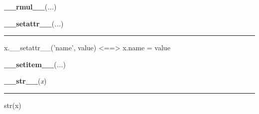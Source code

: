     \begin{boxedminipage}{\textwidth}

    \raggedright \textbf{\_\_rmul\_\_}(\textit{...})

    \end{boxedminipage}

    \label{object:__setattr__}

    \vspace{0.5ex}

    \begin{boxedminipage}{\textwidth}

    \raggedright \textbf{\_\_setattr\_\_}(\textit{...})

    \vspace{-1.5ex}

    \rule{\textwidth}{0.5\fboxrule}

x.{\_}{\_}setattr{\_}{\_}('name', value) {\textless}=={\textgreater} x.name = value
    \vspace{1ex}

    \end{boxedminipage}

    \label{bitarray:_bitarray:__setitem__}

    \vspace{0.5ex}

    \begin{boxedminipage}{\textwidth}

    \raggedright \textbf{\_\_setitem\_\_}(\textit{...})

    \end{boxedminipage}

    \label{object:__str__}

    \vspace{0.5ex}

    \begin{boxedminipage}{\textwidth}

    \raggedright \textbf{\_\_str\_\_}(\textit{x})

    \vspace{-1.5ex}

    \rule{\textwidth}{0.5\fboxrule}

str(x)
    \vspace{1ex}

    \end{boxedminipage}

